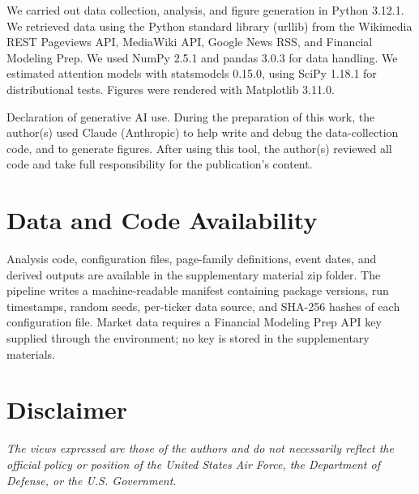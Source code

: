 \elsevierclasstrue\documentclass[preprint,12pt]{elsarticle}%
\begin{document}
We carried out data collection, analysis, and figure generation in Python 3.12.1. We retrieved data using the Python standard library (urllib) from the Wikimedia REST Pageviews API, MediaWiki API, Google News RSS, and Financial Modeling Prep. We used NumPy 2.5.1 and pandas 3.0.3 for data handling. We estimated attention models with statsmodels 0.15.0, using SciPy 1.18.1 for distributional tests. Figures were rendered with Matplotlib 3.11.0.

Declaration of generative AI use. During the preparation of this work, the author(s) used Claude (Anthropic) to help write and debug the data-collection code, and to generate figures. After using this tool, the author(s) reviewed all code and take full responsibility for the publication's content.


\section*{Data and Code Availability}

Analysis code, configuration files, page-family definitions, event dates, and derived outputs are available in the supplementary material zip folder. The pipeline writes a machine-readable manifest containing package versions, run timestamps, random seeds, per-ticker data source, and SHA-256 hashes of each configuration file. Market data requires a Financial Modeling Prep API key supplied through the environment; no key is stored in the supplementary materials.

\section*{Disclaimer}
\textit{The views expressed are those of the authors and do not necessarily reflect the official policy or position of the United States Air Force, the Department of Defense, or the U.S. Government.
}
\ifelsevierclass
  
\else
  
\fi

\end{document}
